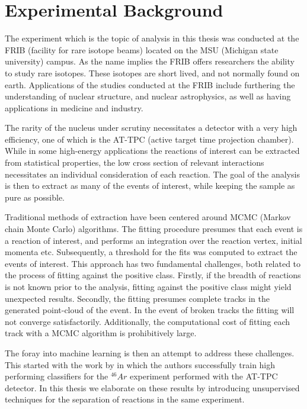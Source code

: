 \chapter{Experimental Background}\label{ch:experimental}

The experiment which is the topic of analysis in this thesis was conducted at the FRIB (facility for rare isotope beams) located on the MSU (Michigan state university) campus. As the name implies the FRIB offers researchers the ability to study rare isotopes. These isotopes are short lived, and not normally found on earth. Applications of the studies conducted at the FRIB include furthering the understanding of nuclear structure, and nuclear astrophysics, as well as having applications in medicine and industry. 

The rarity of the nucleus under scrutiny necessitates a detector with a very high efficiency, one of which is the AT-TPC (active target time projection chamber). While in some high-energy applications the reactions of interest can be extracted from statistical properties, the low cross section of relevant interactions necessitates an individual consideration of each reaction. The goal of the analysis is then to extract as many of the events of interest, while keeping the sample as pure as possible. 

Traditional methods of extraction have been centered around MCMC (Markov chain Monte Carlo) algorithms. The fitting procedure presumes that each event is a reaction of interest, and performs an integration over the reaction vertex, initial momenta etc. Subsequently, a threshold for the fits was computed to extract the events of interest. This approach has two fundamental challenges, both related to the process of fitting against the positive class. Firstly, if the breadth of reactions is not known prior to the analysis, fitting against the positive class might yield unexpected results. Secondly, the fitting presumes complete tracks in the generated point-cloud of the event. In the event of broken tracks the fitting will not converge satisfactorily. Additionally, the computational cost of fitting each track with a MCMC algorithm is prohibitively large. 

The foray into machine learning is then an attempt to address these challenges. This started with the work by \cite{Kuchera2019} in which the authors successfully train high performing classifiers for the ${}^{46}Ar$ experiment performed with the AT-TPC detector. In this thesis we elaborate on these results by introducing unsupervised techniques for the separation of reactions in the same experiment.